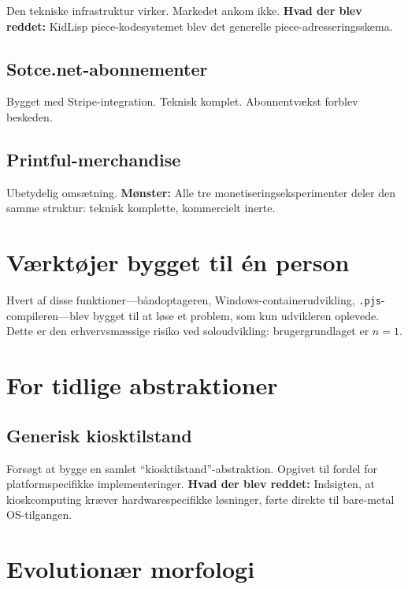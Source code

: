 \documentclass[10pt,letterpaper,twocolumn]{article}
\begin{document}
Den tekniske infrastruktur virker. Markedet ankom ikke. \textbf{Hvad der blev reddet:} KidLisp piece-kodesystemet blev det generelle piece-adresseringsskema.

\subsection{Sotce.net-abonnementer}

Bygget med Stripe-integration. Teknisk komplet. Abonnentvækst forblev beskeden.

\subsection{Printful-merchandise}

Ubetydelig omsætning. \textbf{Mønster:} Alle tre monetiseringseksperimenter deler den samme struktur: teknisk komplette, kommercielt inerte.

\section{Værktøjer bygget til én person}

Hvert af disse funktioner---båndoptageren, Windows-containerudvikling, \texttt{.pjs}-compileren---blev bygget til at løse et problem, som kun udvikleren oplevede. Dette er den erhvervsmæssige risiko ved soloudvikling: brugergrundlaget er $n=1$.

\section{For tidlige abstraktioner}

\subsection{Generisk kiosktilstand}

Forsøgt at bygge en samlet ``kiosktilstand''-abstraktion. Opgivet til fordel for platformspecifikke implementeringer. \textbf{Hvad der blev reddet:} Indsigten, at kioskcomputing kræver hardwarespecifikke løsninger, førte direkte til bare-metal OS-tilgangen.

\section{Evolutionær morfologi}
\end{document}
